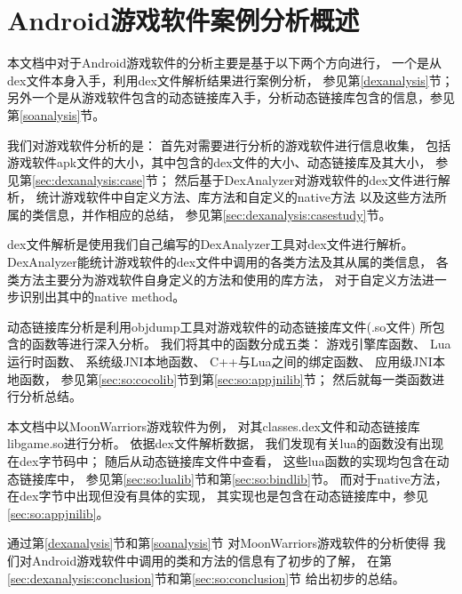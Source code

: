 \section{Android游戏软件案例分析概述}
本文档中对于Android游戏软件的分析主要是基于以下两个方向进行，
一个是从dex文件本身入手，利用dex文件解析结果进行案例分析，
参见第\ref{dexanalysis}节；
另外一个是从游戏软件包含的动态链接库入手，分析动态链接库包含的信息，参见第\ref{soanalysis}节。

我们对游戏软件分析的是：
首先对需要进行分析的游戏软件进行信息收集，
包括游戏软件apk文件的大小，其中包含的dex文件的大小、动态链接库及其大小，
参见第\ref{sec:dexanalysis:case}节；
然后基于DexAnalyzer对游戏软件的dex文件进行解析，
统计游戏软件中自定义方法、库方法和自定义的native方法
以及这些方法所属的类信息，并作相应的总结，
参见第\ref{sec:dexanalysis:casestudy}节。

dex文件解析是使用我们自己编写的DexAnalyzer工具对dex文件进行解析。
DexAnalyzer能统计游戏软件的dex文件中调用的各类方法及其从属的类信息，
各类方法主要分为游戏软件自身定义的方法和使用的库方法，
对于自定义方法进一步识别出其中的native method。

动态链接库分析是利用objdump工具对游戏软件的动态链接库文件(.so文件)
所包含的函数等进行深入分析。
我们将其中的函数分成五类：
游戏引擎库函数、
Lua运行时函数、
系统级JNI本地函数、
C++与Lua之间的绑定函数、
应用级JNI本地函数，
参见第\ref{sec:so:cocolib}节到第\ref{sec:so:appjnilib}节；
然后就每一类函数进行分析总结。

本文档中以MoonWarriors游戏软件为例，
对其classes.dex文件和动态链接库libgame.so进行分析。
依据dex文件解析数据，
我们发现有关lua的函数没有出现在dex字节码中；
随后从动态链接库文件中查看，
这些lua函数的实现均包含在动态链接库中，
参见第\ref{sec:so:lualib}节和第\ref{sec:so:bindlib}节。
而对于native方法，在dex字节中出现但没有具体的实现，
其实现也是包含在动态链接库中，参见\ref{sec:so:appjnilib}。

通过第\ref{dexanalysis}节和第\ref{soanalysis}节
对MoonWarriors游戏软件的分析使得
我们对Android游戏软件中调用的类和方法的信息有了初步的了解，
在第\ref{sec:dexanalysis:conclusion}节和第\ref{sec:so:conclusion}节
给出初步的总结。


